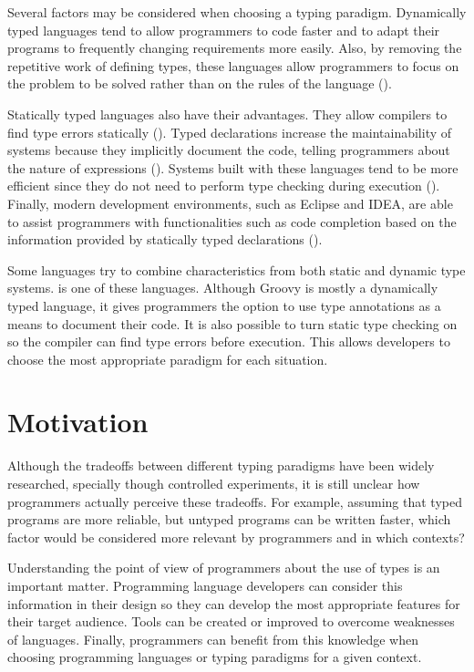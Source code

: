 \documentclass[msc]{ppgccufmg}
\begin{document}
Several factors may be considered when choosing a typing paradigm. 
Dynamically typed languages tend to allow programmers to code faster and to adapt their programs to frequently changing requirements more easily.
Also, by removing the repetitive work of defining types, these languages allow programmers to focus on the problem to be solved rather than on the rules of the language (\cite{dynamically_typed_languages}).

Statically typed languages also have their advantages. 
They allow compilers to find type errors statically (\cite{should_your_specification_language_be_typed}). 
Typed declarations increase the maintainability of systems because they implicitly document the code, telling programmers about the nature of expressions (\cite{type_systems,mayer2012static}). 
Systems built with these languages tend to be more efficient since they do not need to perform type checking during execution (\cite{Bruce2002,jit}). 
Finally, modern development environments, such as Eclipse and IDEA, are able to assist programmers with functionalities such as code completion based on the information provided by statically typed declarations (\cite{bruch2009learning}).

Some languages try to combine characteristics from both static and dynamic type systems.
\cite{groovy} is one of these languages.
Although Groovy is mostly a dynamically typed language, it gives programmers the option to use type annotations as a means to document their code.
It is also possible to turn static type checking on so the compiler can find type errors before execution.
This allows developers to choose the most appropriate paradigm for each situation.


\section{Motivation}
Although the tradeoffs between different typing paradigms have been widely researched, specially though controlled experiments, it is still unclear how programmers actually perceive these tradeoffs.
For example, assuming that typed programs are more reliable, but untyped programs can be written faster, which factor would be considered more relevant by programmers and in which contexts?

Understanding the point of view of programmers about the use of types is an important matter.
Programming language developers can consider this information in their design so they can develop the most appropriate features for their target audience.
Tools can be created or improved to overcome weaknesses of languages. 
Finally, programmers can benefit from this knowledge when choosing programming languages or typing paradigms for a given context.
\end{document}
